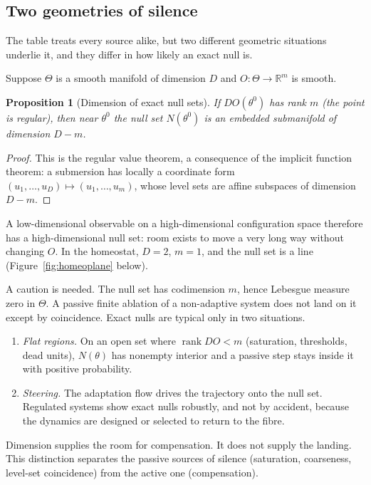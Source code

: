 \documentclass[11pt]{article}
\newtheorem{proposition}[theorem]{Proposition}
\theoremstyle{definition}
\theoremstyle{remark}
\newcommand{\R}{\mathbb{R}}
\begin{document}
\subsection{Two geometries of silence}

The table treats every source alike, but two different geometric situations underlie it, and they differ in how likely an exact null is.

Suppose $\Theta$ is a smooth manifold of dimension $D$ and $O:\Theta\to\R^m$ is smooth.

\begin{proposition}[Dimension of exact null sets]\label{prop:dimension}
If $DO(\theta^0)$ has rank $m$ (the point is regular), then near $\theta^0$ the null set $N(\theta^0)$ is an embedded submanifold of dimension $D-m$.
\end{proposition}
\begin{proof}
This is the regular value theorem, a consequence of the implicit function theorem: a submersion has locally a coordinate form $(u_1,\dots,u_D)\mapsto(u_1,\dots,u_m)$, whose level sets are affine subspaces of dimension $D-m$.
\end{proof}

A low-dimensional observable on a high-dimensional configuration space therefore has a high-dimensional null set: room exists to move a very long way without changing $O$. In the homeostat, $D=2$, $m=1$, and the null set is a line (Figure~\ref{fig:homeoplane} below).

A caution is needed. The null set has codimension $m$, hence Lebesgue measure zero in $\Theta$. A passive finite ablation of a non-adaptive system does not land on it except by coincidence. Exact nulls are typical only in two situations.
\begin{enumerate}[label=(\alph*)]
\item \emph{Flat regions.} On an open set where $\operatorname{rank}DO<m$ (saturation, thresholds, dead units), $N(\theta)$ has nonempty interior and a passive step stays inside it with positive probability.
\item \emph{Steering.} The adaptation flow drives the trajectory onto the null set. Regulated systems show exact nulls robustly, and not by accident, because the dynamics are designed or selected to return to the fibre.
\end{enumerate}
Dimension supplies the room for compensation. It does not supply the landing. This distinction separates the passive sources of silence (saturation, coarseness, level-set coincidence) from the active one (compensation).
\end{document}
